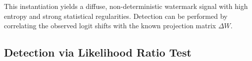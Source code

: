 This instantiation yields a diffuse, non-deterministic watermark signal with high entropy and strong statistical regularities. Detection can be performed by correlating the observed logit shifts with the known projection matrix \( \Delta W \).




\subsection{Detection via Likelihood Ratio Test}

